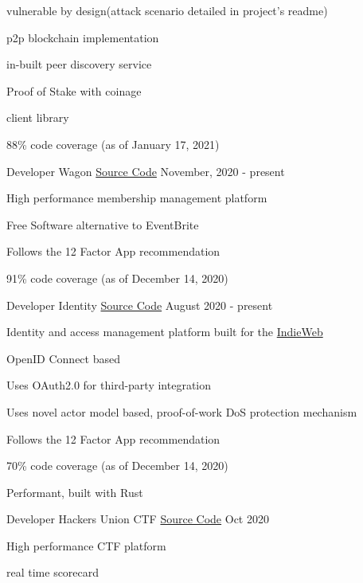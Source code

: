 \begin{cventries}
{\begin{cvitems}
      \item {vulnerable by design(attack scenario detailed in project's readme)}
        \item {p2p blockchain implementation}
        \item {in-built peer discovery service}
        \item {Proof of Stake with coinage}
        \item {client library}
		\item {88\% code coverage  (as of January 17, 2021)}
      \end{cvitems}
    }
  \cventry
    {Developer} %
    {Wagon} %
    {\href{https://github.com/realaravinth/wagon}{Source Code}} %
    {November, 2020 - present} %
    {
      \begin{cvitems} %
        \item {High performance membership management platform}
        \item {Free Software alternative to EventBrite}
        \item {Follows the 12 Factor App recommendation}
		\item {91\% code coverage  (as of December 14, 2020)}
      \end{cvitems}
    }

  \cventry
    {Developer} %
    {Identity} %
    {\href{https://github.com/shuttlecraft/identity}{Source Code}} %
    {August 2020 - present} %
    {
      \begin{cvitems} %
      	\item {Identity and access management platform built for the \href{https://github.com/shuttlecraft/identity/blob/master/indieweb.org}{IndieWeb}}
		\item {OpenID Connect based}
		\item {Uses OAuth2.0 for third-party integration}
		\item {Uses novel actor model based, proof-of-work DoS protection mechanism}
		\item {Follows the 12 Factor App recommendation}
		\item {70\% code coverage  (as of December 14, 2020)}
		\item {Performant, built with Rust}
	  \end{cvitems}
    }
    
  \cventry
    {Developer}
    {Hackers Union CTF}
    {\href{https://github.com/realaravinth/hunion-backend}{Source Code}}
    {Oct 2020}
    {
        \begin{cvitems} %
        \item {High performance CTF platform}
        \item {real time scorecard}
        \end{cvitems}
    }
    

\end{cventries}
